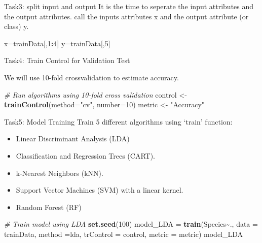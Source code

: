 \documentclass[
]{article}
\newenvironment{Shaded}{\begin{snugshade}}{\end{snugshade}}
\newcommand{\AttributeTok}[1]{\textcolor[rgb]{0.13,0.29,0.53}{#1}}
\newcommand{\CommentTok}[1]{\textcolor[rgb]{0.56,0.35,0.01}{\textit{#1}}}
\newcommand{\DecValTok}[1]{\textcolor[rgb]{0.00,0.00,0.81}{#1}}
\newcommand{\FunctionTok}[1]{\textcolor[rgb]{0.13,0.29,0.53}{\textbf{#1}}}
\newcommand{\NormalTok}[1]{#1}
\newcommand{\OtherTok}[1]{\textcolor[rgb]{0.56,0.35,0.01}{#1}}
\newcommand{\SpecialCharTok}[1]{\textcolor[rgb]{0.81,0.36,0.00}{\textbf{#1}}}
\newcommand{\StringTok}[1]{\textcolor[rgb]{0.31,0.60,0.02}{#1}}
\providecommand{\tightlist}{%
  \setlength{\itemsep}{0pt}\setlength{\parskip}{0pt}}
\begin{document}
Task3: split input and output It is the time to seperate the input
attributes and the output attributes. call the inputs attributes x and
the output attribute (or class) y.

\begin{Shaded}
\begin{Highlighting}[]
\NormalTok{x}\OtherTok{=}\NormalTok{trainData[,}\DecValTok{1}\SpecialCharTok{:}\DecValTok{4}\NormalTok{]}
\NormalTok{y}\OtherTok{=}\NormalTok{trainData[,}\DecValTok{5}\NormalTok{]}
\end{Highlighting}
\end{Shaded}

Task4: Train Control for Validation Test

We will use 10-fold crossvalidation to estimate accuracy.

\begin{Shaded}
\begin{Highlighting}[]
\CommentTok{\# Run algorithms using 10{-}fold cross validation}
\NormalTok{control }\OtherTok{\textless{}{-}} \FunctionTok{trainControl}\NormalTok{(}\AttributeTok{method=}\StringTok{"cv"}\NormalTok{, }\AttributeTok{number=}\DecValTok{10}\NormalTok{)}
\NormalTok{metric }\OtherTok{\textless{}{-}} \StringTok{"Accuracy"}
\end{Highlighting}
\end{Shaded}

Task5: Model Training Train 5 different algorithms using `train'
function:

\begin{itemize}
\tightlist
\item
  Linear Discriminant Analysis (LDA)
\item
  Classification and Regression Trees (CART).
\item
  k-Nearest Neighbors (kNN).
\item
  Support Vector Machines (SVM) with a linear kernel.
\item
  Random Forest (RF)
\end{itemize}

\begin{Shaded}
\begin{Highlighting}[]
\CommentTok{\# Train model using LDA}
\FunctionTok{set.seed}\NormalTok{(}\DecValTok{100}\NormalTok{)}
\NormalTok{model\_LDA }\OtherTok{=} \FunctionTok{train}\NormalTok{(Species}\SpecialCharTok{\textasciitilde{}}\NormalTok{., }\AttributeTok{data =}\NormalTok{ trainData, }\AttributeTok{method =}\StringTok{\textquotesingle{}lda\textquotesingle{}}\NormalTok{, }\AttributeTok{trControl =}\NormalTok{ control, }\AttributeTok{metric =}\NormalTok{ metric)}
\NormalTok{model\_LDA}
\end{Highlighting}
\end{Shaded}
\end{document}
